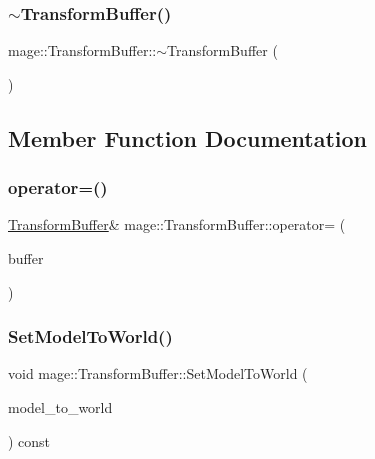 \subsubsection{\texorpdfstring{$\sim$\+Transform\+Buffer()}{~TransformBuffer()}}
{\footnotesize\ttfamily mage\+::\+Transform\+Buffer\+::$\sim$\+Transform\+Buffer (\begin{DoxyParamCaption}{ }\end{DoxyParamCaption})\hspace{0.3cm}{\ttfamily [default]}}



\subsection{Member Function Documentation}
\hypertarget{structmage_1_1_transform_buffer_a5268ed4c7f416a54976f7ad18a1cb108}{}\label{structmage_1_1_transform_buffer_a5268ed4c7f416a54976f7ad18a1cb108} 
\subsubsection{\texorpdfstring{operator=()}{operator=()}}
{\footnotesize\ttfamily \hyperlink{structmage_1_1_transform_buffer}{Transform\+Buffer}\& mage\+::\+Transform\+Buffer\+::operator= (\begin{DoxyParamCaption}\item[{const \hyperlink{structmage_1_1_transform_buffer}{Transform\+Buffer} \&}]{buffer }\end{DoxyParamCaption})\hspace{0.3cm}{\ttfamily [default]}}

\hypertarget{structmage_1_1_transform_buffer_ab9d62cf4fc2332242333b4649779e706}{}\label{structmage_1_1_transform_buffer_ab9d62cf4fc2332242333b4649779e706} 
\subsubsection{\texorpdfstring{Set\+Model\+To\+World()}{SetModelToWorld()}}
{\footnotesize\ttfamily void mage\+::\+Transform\+Buffer\+::\+Set\+Model\+To\+World (\begin{DoxyParamCaption}\item[{const X\+M\+M\+A\+T\+R\+IX \&}]{model\+\_\+to\+\_\+world }\end{DoxyParamCaption}) const}



